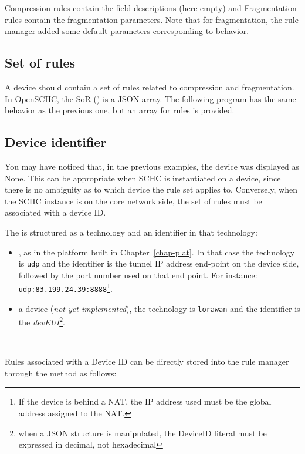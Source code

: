 Compression rules contain the field descriptions (here empty) and Fragmentation rules contain the fragmentation parameters. Note that for fragmentation, the rule manager added some default parameters corresponding to  behavior.



\subsection{Set of rules}

A device should contain a set of rules related to compression and fragmentation. In OpenSCHC, the SoR () is a JSON array. The following program has the same behavior as the previous one, but an array for rules is provided.


\subsection{Device identifier}

You may have noticed that, in the previous examples, the device was displayed as None. This can be appropriate when SCHC is instantiated on a device, since there is no ambiguity as to which device the rule set applies to. Conversely, when the SCHC instance is on the core network side, the set of rules must be associated with a device ID.

The  is structured as a technology and an identifier in that technology:
\begin{itemize}
\item {}, as in the platform built in Chapter~\vref{chap-plat}. In that case the technology is \texttt{udp} and the identifier is the tunnel IP address end-point on the device side, followed by the port number used on that end point. For instance: \texttt{udp:83.199.24.39:8888}\footnote{If the device is behind a NAT, the IP address used must be the global address assigned to the NAT.}. 
\item a  device (\textit{not yet implemented}), the technology is \texttt{lorawan} and the identifier is the \textit{devEUI}\footnote{when a JSON structure is manipulated, the DeviceID literal must be expressed in decimal, not hexadecimal}.

\end{itemize}

~~

Rules associated with a Device ID can be directly stored into the rule manager through the  method as follows:

